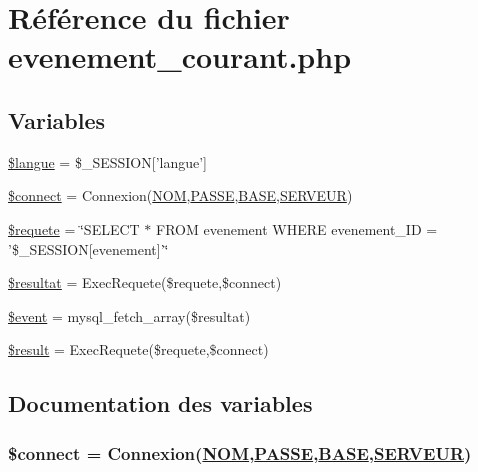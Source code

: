 \hypertarget{evenement__courant_8php}{
\section{R\'{e}f\'{e}rence du fichier evenement\_\-courant.php}
\label{evenement__courant_8php}
}
\subsection*{Variables}
\begin{CompactItemize}
\item 
\hyperlink{evenement__courant_8php_a0}{\$langue} = \$\_\-SESSION\mbox{[}'langue'\mbox{]}
\item 
\hyperlink{evenement__courant_8php_a1}{\$connect} = Connexion(\hyperlink{pma__connect_8php_a0}{NOM},\hyperlink{pma__connect_8php_a1}{PASSE},\hyperlink{pma__connect_8php_a3}{BASE},\hyperlink{pma__connect_8php_a2}{SERVEUR})
\item 
\hyperlink{evenement__courant_8php_a2}{\$requete} = \char`\"{}SELECT $\ast$ FROM evenement WHERE evenement\_\-ID = '\$\_\-SESSION\mbox{[}evenement\mbox{]}'\char`\"{}
\item 
\hyperlink{evenement__courant_8php_a3}{\$resultat} = Exec\-Requete(\$requete,\$connect)
\item 
\hyperlink{evenement__courant_8php_a4}{\$event} = mysql\_\-fetch\_\-array(\$resultat)
\item 
\hyperlink{evenement__courant_8php_a5}{\$result} = Exec\-Requete(\$requete,\$connect)
\end{CompactItemize}


\subsection{Documentation des variables}
\hypertarget{evenement__courant_8php_a1}{
\subsubsection[\$connect]{\setlength{\rightskip}{0pt plus 5cm}\$connect = Connexion(\hyperlink{pma__connect_8php_a0}{NOM},\hyperlink{pma__connect_8php_a1}{PASSE},\hyperlink{pma__connect_8php_a3}{BASE},\hyperlink{pma__connect_8php_a2}{SERVEUR})}}
\label{evenement__courant_8php_a1}


